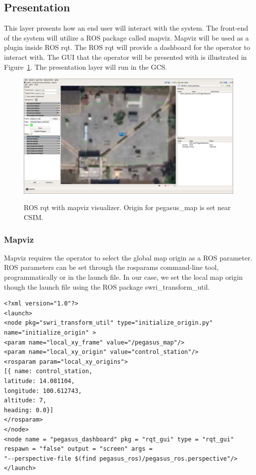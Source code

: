 \subsection{Presentation}

This layer presents how an end user will interact with the system. The front-end of the system will utilize a ROS package called mapviz. Mapviz will be used as a plugin inside ROS rqt. The ROS rqt will provide a dashboard for the operator to interact with. The GUI that the operator will be presented with is illustrated in Figure~\ref{fig:mapviz-screenshot}. The presentation layer will run in the GCS.

\begin{figure}
	\centering
	\caption[Pegasus presentation dashboard]{\small ROS rqt with mapviz visualizer. Origin for pegasus\_map is set near CSIM.}
	\includegraphics[width=5in]{figures/methodology/presentation/mapviz-1}
	\label{fig:mapviz-screenshot}
\end{figure}


\subsubsection{Mapviz}
Mapviz requires the operator to select the global map origin as a ROS parameter. ROS parameters can be set through the rosparams command-line tool, programmatically or in the launch file. In our case, we set the local map origin though the launch file using the ROS package swri\_transform\_util.


\begin{verbatim}
<?xml version="1.0"?>
<launch>
<node pkg="swri_transform_util" type="initialize_origin.py"
name="initialize_origin" >
<param name="local_xy_frame" value="/pegasus_map"/>
<param name="local_xy_origin" value="control_station"/>
<rosparam param="local_xy_origins">
[{ name: control_station,
latitude: 14.081104,
longitude: 100.612743,
altitude: 7,
heading: 0.0}]
</rosparam>
</node>
<node name = "pegasus_dashboard" pkg = "rqt_gui" type = "rqt_gui" 
respawn = "false" output = "screen" args = 
"--perspective-file $(find pegasus_ros)/pegasus_ros.perspective"/>
</launch>
\end{verbatim}


